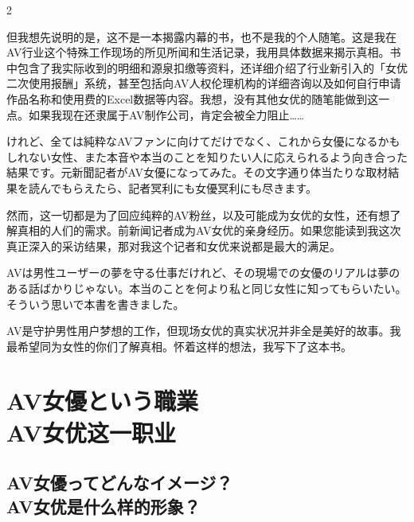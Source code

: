 \documentclass[12pt,UTF8]{ctexbook}
\begin{document}
\begin{paracol}{2}
\switchcolumn

但我想先说明的是，这不是一本揭露内幕的书，也不是我的个人随笔。这是我在AV行业这个特殊工作现场的所见所闻和生活记录，我用具体数据来揭示真相。书中包含了我实际收到的明细和源泉扣缴等资料，还详细介绍了行业新引入的「女优二次使用报酬」系统，甚至包括向AV人权伦理机构的详细咨询以及如何自行申请作品名称和使用费的Excel数据等内容。我想，没有其他女优的随笔能做到这一点。如果我现在还隶属于AV制作公司，肯定会被全力阻止……

\switchcolumn*

けれど、全ては純粋なAVファンに向けてだけでなく、これから女優になるかもしれない女性、また本音や本当のことを知りたい人に応えられるよう向き合った結果です。元新聞記者がAV女優になってみた。その文字通り体当たりな取材結果を読んでもらえたら、記者冥利にも女優冥利にも尽きます。

\switchcolumn

然而，这一切都是为了回应纯粹的AV粉丝，以及可能成为女优的女性，还有想了解真相的人们的需求。前新闻记者成为AV女优的亲身经历。如果您能读到我这次真正深入的采访结果，那对我这个记者和女优来说都是最大的满足。

\switchcolumn*

AVは男性ユーザーの夢を守る仕事だけれど、その現場での女優のリアルは夢のある話ばかりじゃない。本当のことを何より私と同じ女性に知ってもらいたい。そういう思いで本書を書きました。

\switchcolumn

AV是守护男性用户梦想的工作，但现场女优的真实状况并非全是美好的故事。我最希望同为女性的你们了解真相。怀着这样的想法，我写下了这本书。

\end{paracol}

\mainmatter

\chapter{AV女優という職業\\AV女优这一职业}

\section{AV女優ってどんなイメージ？\\AV女优是什么样的形象？}
\end{document}
